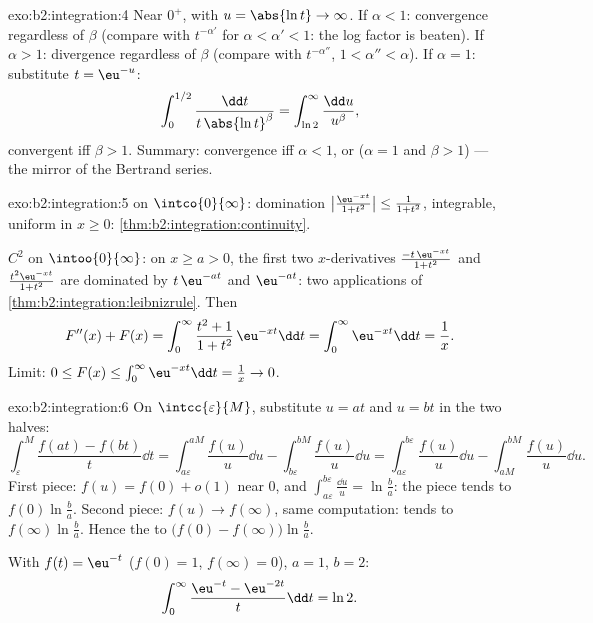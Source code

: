\begin{solution}{exo:b2:integration:4}
Near $0^+$, with $u = \abs{\ln t} \to \infty$. If $\alpha < 1$:
convergence regardless of $\beta$ (compare with $t^{-\alpha'}$ for
$\alpha < \alpha' < 1$: the log factor is beaten). If $\alpha > 1$:
divergence regardless of $\beta$ (compare with $t^{-\alpha''}$,
$1 < \alpha'' < \alpha$). If $\alpha = 1$: substitute $t =
\eu^{-u}$:
\[
\int_0^{1/2} \frac{\dd t}{t\,\abs{\ln t}^\beta}
= \int_{\ln 2}^{\infty} \frac{\dd u}{u^\beta},
\]
convergent iff $\beta > 1$. Summary: convergence iff $\alpha < 1$,
or ($\alpha = 1$ and $\beta > 1$) --- the mirror of the Bertrand
series.
\end{solution}

\begin{solution}{exo:b2:integration:5}
 on $\intco{0}{\infty}$: domination
$\bigl|\frac{\eu^{-xt}}{1+t^2}\bigr| \leq \frac{1}{1+t^2}$,
integrable, uniform in $x \geq 0$:
\cref{thm:b2:integration:continuity}.

$C^2$ on $\intoo{0}{\infty}$: on $x \geq a > 0$, the first two
$x$-derivatives $\frac{-t\,\eu^{-xt}}{1+t^2}$ and
$\frac{t^2\eu^{-xt}}{1+t^2}$ are dominated by $t\,\eu^{-at}$ and
$\eu^{-at}$: two applications of
\cref{thm:b2:integration:leibnizrule}. Then
\[
F''(x) + F(x) = \int_0^\infty \frac{t^2 + 1}{1 + t^2}\,\eu^{-xt}\dd
t = \int_0^\infty \eu^{-xt}\dd t = \frac1x .
\]
Limit: $0 \leq F(x) \leq \int_0^\infty \eu^{-xt}\dd t = \frac1x \to
0$.
\end{solution}

\begin{solution}{exo:b2:integration:6}
On $\intcc{\varepsilon}{M}$, substitute $u = at$ and $u = bt$ in
the two halves:
\[
\int_\varepsilon^M \frac{f(at) - f(bt)}{t}\dd t
= \int_{a\varepsilon}^{aM}\frac{f(u)}{u}\dd u
- \int_{b\varepsilon}^{bM}\frac{f(u)}{u}\dd u
= \int_{a\varepsilon}^{b\varepsilon} \frac{f(u)}{u}\dd u
- \int_{aM}^{bM} \frac{f(u)}{u}\dd u .
\]
First piece: $f(u) = f(0) + o(1)$ near $0$, and $\int_{a\varepsilon}
^{b\varepsilon} \frac{\dd u}{u} = \ln\frac ba$: the piece tends to
$f(0)\ln\frac ba$. Second piece: $f(u) \to f(\infty)$, same
computation: tends to $f(\infty)\ln\frac ba$. Hence the   to $\bigl(f(0) - f(\infty)\bigr)\ln\frac ba$.

With $f(t) = \eu^{-t}$ ($f(0) = 1$, $f(\infty) = 0$), $a = 1$, $b
= 2$:
\[
\int_0^\infty \frac{\eu^{-t} - \eu^{-2t}}{t}\dd t = \ln 2 .
\]
\end{solution}

